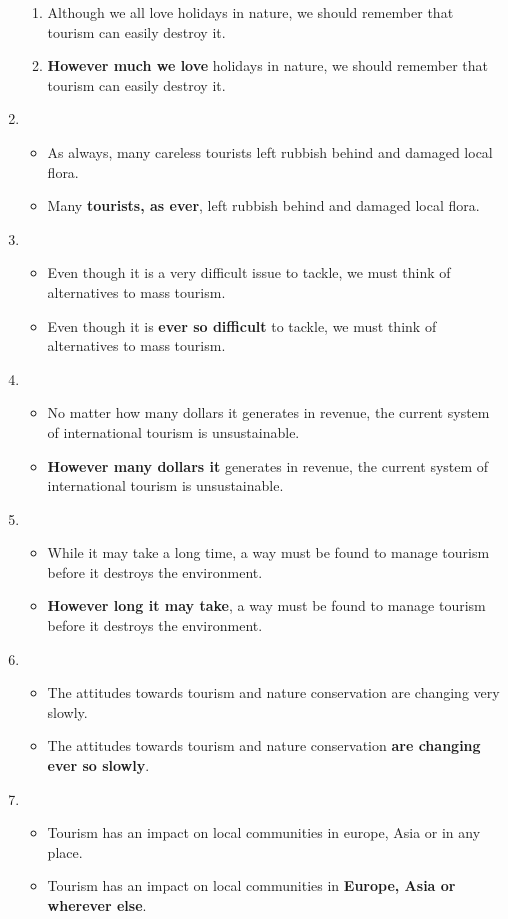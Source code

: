 \documentclass[a4paper]{article}
\begin{document}
\begin{enumerate}
\begin{enumerate}
        \item Although we all love holidays in nature, we should remember that tourism can easily destroy it.
        \item \textbf{However much we love} holidays in nature, we should remember that tourism can easily destroy it.
    \end{enumerate}
    \pagebreak
    \item \begin{itemize}
        \item As always, many careless tourists left rubbish behind and damaged local flora.
        \item Many \textbf{tourists, as ever}, left rubbish behind and damaged local flora.
    \end{itemize}
    \item \begin{itemize}
        \item Even though it is a very difficult issue to tackle, we must think of alternatives to mass tourism.
        \item Even though it is \textbf{ever so difficult} to tackle, we must think of alternatives to mass tourism.
    \end{itemize}
    \item \begin{itemize}
        \item No matter how many dollars it generates in revenue, the current system of international tourism is unsustainable.
        \item \textbf{However many dollars it} generates in revenue, the current system of international tourism is unsustainable.
    \end{itemize}
    \item \begin{itemize}
        \item While it may take a long time, a way must be found to manage tourism before it destroys the environment.
        \item \textbf{However long it may take}, a way must be found to manage tourism before it destroys the environment.
    \end{itemize}
    \item \begin{itemize}
        \item The attitudes towards tourism and nature conservation are changing very slowly.
        \item The attitudes towards tourism and nature conservation \textbf{are changing ever so slowly}.
    \end{itemize}
    \item \begin{itemize}
        \item Tourism has an impact on local communities in europe, Asia or in any place.
        \item Tourism has an impact on local communities in \textbf{Europe, Asia or wherever else}.
    \end{itemize}
\end{enumerate}
\end{document}
